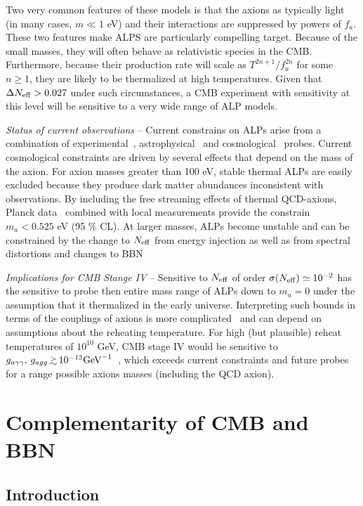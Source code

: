 Two very common features of these models is that the axions as typically light (in many cases, $m \ll 1$ eV) and their interactions are suppressed by powers of $f_a$.  These two features make ALPS are particularly compelling target.  Because of the small masses, they will often behave as relativistic species in the CMB.  Furthermore, because their production rate will scale as $T^{2n +1} / f_a^{2n}$ for some $n \geq 1$, they are likely to be thermalized at high temperatures.  Given that $\Delta N_{\rm eff} > 0.027$ under such circumstances, a CMB experiment with sensitivity at this level will be sensitive to a very wide range of ALP models.

{\it Status of current observations} -- Current constrains on ALPs arise from a combination of experimental~\cite{Graham:2015ouw}, astrophysical~\cite{Raffelt:2012kt} and cosmological~\cite{Marsh:2015xka} probes.  Current cosmological constraints are driven by several effects that depend on the mass of the axion.  For axion masses greater than 100 eV, stable thermal ALPs are easily excluded because they produce dark matter abundances inconsistent with observations.  By including the free streaming effects of thermal QCD-axions,  Planck data~\cite{DiValentino:2015wba} combined with local measurements provide the constrain $m_a < 0.525$ eV (95 \% CL).  At larger masses, ALPs become unstable and can be constrained by the change to $N_{\rm eff}$ from energy injection as well as from spectral distortions and changes to BBN~\cite{Cadamuro:2011fd,Follin:2015hya}

{\it Implications for CMB Stange IV} -- Sensitive to $N_{\rm eff}$ of order $\sigma(N_{\rm eff}) \simeq 10^{-2}$ has the sensitive to probe then entire mass range of ALPs down to $m_a =0$ under the assumption that it thermalized in the early universe.  Interpreting such bounds in terms of the couplings of axions is more complicated~\cite{Brust:2013xpv} and can depend on assumptions about the reheating temperature.  For high (but plausible) reheat temperatures of $10^{10}$ GeV, CMB stage IV would be sensitive to $g_{a\gamma \gamma}, \, g_{a g g} \,  \gtrsim \, 10^{-13} {\rm GeV}^{-1}$~\cite{}, which exceeds current constraints and future probes for a range possible axions masses (including the QCD axion).  

\section{Complementarity of CMB and BBN}

\subsection{Introduction} \label{Introduction}

